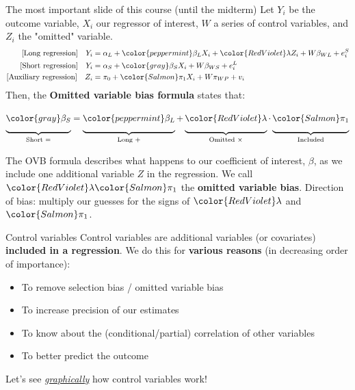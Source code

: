 \documentclass[11pt]{beamer}
\begin{document}
\begin{frame}{The most important slide of this course (until the midterm)}
Let $Y_i$ be the outcome variable, $X_i$ our regressor of interest, $W$ a series of control variables, and $Z_i$ the "omitted" variable.
\begin{align*}
   \text{[Long regression]} \quad Y_i &= \alpha_L + {\color{peppermint}\beta_L} X_i + {\color{RedViolet}\lambda}Z_i +  W\beta_{WL}  + e_i^S \\
   \text{[Short regression]} \quad Y_i &= \alpha_S + {\color{gray}\beta_S} X_i  + W\beta_{WS}  +e_i^L \\
   \text{[Auxiliary regression]} \quad Z_i &= \pi_0 +  {\color{Salmon}\pi_
1} X_i + W\pi_{WP}  +v_i 
\end{align*}
    Then, the \textbf{Omitted variable bias formula} states that:
\begin{align*}
   \underbrace{\vphantom{ \left(\frac{a^{0.3}}{b}\right) }{\color{gray}\beta_S}}_{\text{Short =}} = \underbrace{\vphantom{ \left(\frac{a^{0.3}}{b}\right) }{\color{peppermint}\beta_L}}_{\text{Long }+} + \underbrace{\vphantom{ \left(\frac{a^{0.3}}{b}\right) }{\color{RedViolet} \lambda}}_{\text{Omitted } \times} \cdot \underbrace{\vphantom{ \left(\frac{a^{0.3}}{b}\right) }{\color{Salmon}\pi_{1}}}_{\text{Included}}
\end{align*}


The OVB formula describes what happens to our coefficient of interest, $\beta$, as we include one additional variable $Z$ in the regression. We call ${\color{RedViolet} \lambda} {\color{Salmon}\pi_{1}
}$ the \textbf{omitted variable bias}. 
Direction of bias: multiply our guesses for the signs of ${\color{RedViolet} \lambda}$ and ${\color{Salmon}\pi_1}$.
\end{frame}




\begin{frame}{Control variables}
Control variables are additional variables (or covariates) \textbf{included in a regression}. We do this for \textbf{various reasons} (in decreasing order of importance):
\begin{itemize}
    \item To remove selection bias / omitted variable bias
    \item To increase precision of our estimates
    \item To know about the (conditional/partial) correlation of other variables
    \item To better predict the outcome
\end{itemize}

\alert{Let's see \textit{\href{https://datahub.berkeley.edu/user/jonathan\_old/lab/tree/ECON-140-FA24-RDE/Sections/Jonathan/Omitted\%20Variables\%20Bias\%20Example.ipynb}{graphically}} how control variables work!}
\end{frame}
\end{document}
